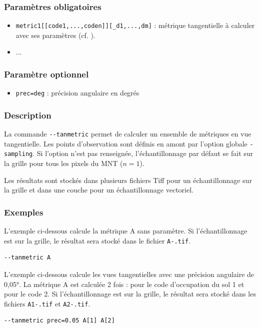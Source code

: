 \documentclass{report}
\begin{document}
\subsubsection{Paramètres obligatoires}
\begin{itemize}
	\item \verb|metric1[[code1,...,coden]][_d1,...,dm]| : métrique tangentielle à calculer avec ses paramètres (cf. ).
	\item ...
\end{itemize}

\subsubsection{Paramètre optionnel}
\begin{itemize}
	\item \verb|prec=deg| : précision angulaire en degrés
\end{itemize}

\subsubsection{Description}
La commande \verb|--tanmetric| permet de calculer un ensemble de métriques en vue tangentielle. Les points d'observation sont définis en amont par l'option globale \verb|-sampling|. Si l'option n'est pas renseignée, l'échantillonnage par défaut se fait sur la grille pour tous les pixels du MNT ($n=1$).

Les résultats sont stockés dans plusieurs fichiers Tiff pour un échantillonnage sur la grille et dans une couche pour un échantillonnage vectoriel.


\subsubsection{Exemples}

L'exemple ci-dessous calcule la métrique A sans paramètre. Si l'échantillonnage est sur la grille, le résultat sera stocké dans le fichier \verb|A-.tif|.
\begin{Verbatim}
--tanmetric A
\end{Verbatim}

L'exemple ci-dessous calcule les vues tangentielles avec une précision angulaire de 0,05°. La métrique A est calculée 2 fois : pour le code d'occupation du sol 1 et pour le code 2. Si l'échantillonnage est sur la grille, le résultat sera stocké dans les fichiers \verb|A1-.tif| et \verb|A2-.tif|.
\begin{Verbatim}
--tanmetric prec=0.05 A[1] A[2]
\end{Verbatim}
\end{document}
